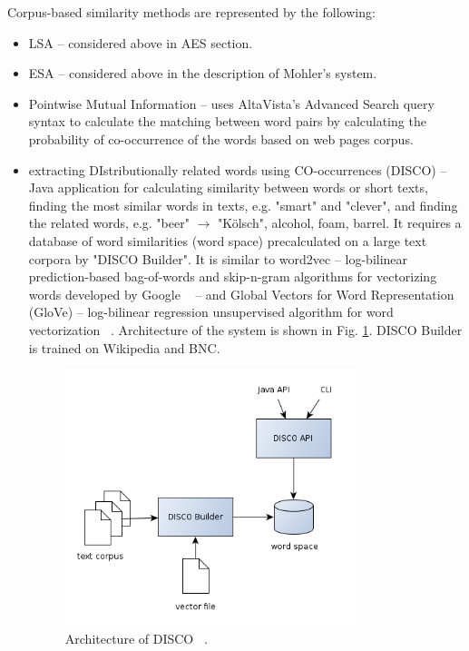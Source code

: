 Corpus-based similarity methods are represented by the following:

\begin{itemize}
\item LSA -- considered above in AES section.
\item ESA -- considered above in the description of Mohler's system.
\item Pointwise Mutual Information -- uses  AltaVista's Advanced Search query syntax to calculate the matching between word pairs by calculating the probability of co-occurrence of the words based on web pages corpus.
\item extracting DIstributionally related words using CO-occurrences (DISCO) -- Java application for calculating similarity between words or short texts, finding the most similar words in texts, e.g. "smart" and "clever", and finding the related words, e.g. "beer" $\rightarrow$ "K\"olsch", alcohol, foam, barrel. It requires a database of word similarities (word space) precalculated on a large text corpora by "DISCO Builder". It is similar to word2vec --  log-bilinear prediction-based bag-of-words and skip-n-gram algorithms for vectorizing words developed by Google  ~\cite{word2vec} -- and Global Vectors for Word Representation (GloVe) -- log-bilinear regression unsupervised algorithm for word vectorization ~\cite{GloVe}. Architecture of the system is shown in Fig. \ref{fig:DISCO}. DISCO Builder is trained on Wikipedia and BNC. 
\begin{figure}[h!]
  \centering
  \includegraphics[width=0.8\textwidth]{img/DISCO}
    \caption{ Architecture of DISCO ~\cite{DISCO}. }\label{fig:DISCO}
\end{figure}
\end{itemize}

